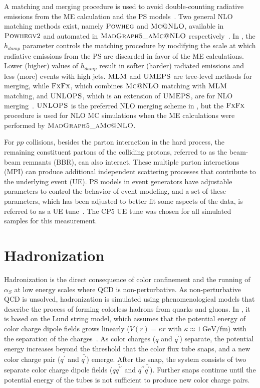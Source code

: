 \begin{refsection}
A matching and merging procedure is used to avoid double-counting radiative emissions from the ME calculation and the PS models~\cite{StefanoFrixione_2007}.
Two general NLO matching methods exist, namely $\textsc{Powheg}$ and $\textsc{Mc@NLO}$, available in ${\textsc{Powhegv2}}$ and automated in $\textsc{MadGraph5\_aMc@NLO}$ respectively~\cite{pythia8.3}.
In \Powheg, the $h_{damp}$ parameter controls the matching procedure by modifying the scale at which radiative emissions from the PS are discarded in favor of the ME calculations.
Lower (higher) values of $h_{damp}$ result in softer (harder) radiated emissions and less (more) events with high \pT jets.
$\textsc{MLM}$ and $\textsc{UMEPS}$ are tree-level methods for merging, while $\textsc{FxFx}$, which combines $\textsc{Mc@NLO}$ matching with $\textsc{MLM}$ matching, and $\textsc{UNLOPS}$, which is an extension of $\textsc{UMEPS}$, are for NLO merging~\cite{pythia8.3}.
$\textsc{UNLOPS}$ is the preferred NLO merging scheme in \Pythia, but the $\textsc{FxFx}$ procedure is used for NLO MC simulations when the ME calculations were performed by $\textsc{MadGraph5\_aMc@NLO}$.

For $pp$ collisions, besides the parton interaction in the hard process, the remaining constituent partons of the colliding protons, referred to as the beam-beam remnants (BBR), can also interact.
These multiple parton interactions (MPI) can produce additional independent scattering processes that contribute to the underlying event (UE).
PS models in event generators have adjustable parameters to control the behavior of event modeling, and a set of these parameters, which has been adjusted to better fit some aspects of the data, is referred to as a UE tune~\cite{Sirunyan:2669320}.
The CP5 UE tune was chosen for all simulated samples for this measurement.

\section{Hadronization}
Hadronization is the direct consequence of color confinement and the running of $\alpha_S$ at low energy scales where QCD is non-perturbative.
As non-perturbative QCD is unsolved, hadronization is simulated using phenomenological models that describe the process of forming colorless hadrons from quarks and gluons.
In \Pythia, it is based on the Lund string model, which assumes that the potential energy of color charge dipole fields grows linearly ($V(r) = \kappa r$ with $\kappa \approx \SI{1}{\GeV \per \femto \m}$) with the separation of the charges~\cite{SJOSTRAND2015159}.
As color charges ($q$ and $\bar{q^\prime}$) separate, the potential energy increases beyond the threshold that the color flux tube snaps, and a new color charge pair ($q^\prime$ and $\bar{q^\prime}$) emerge.
After the snap, the system consists of two separate color charge dipole fields ($q\bar{q^{\prime\prime}}$ and $q^{\prime\prime}\bar{q^\prime}$).
Further snaps continue until the potential energy of the tubes is not sufficient to produce new color charge pairs.


\end{refsection}
